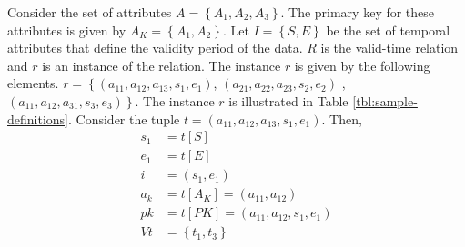 \begin{example}
Consider the set of attributes $A = \left \lbrace A_1, A_2, A_3 \right \rbrace$. The primary key for these attributes is given by $A_K = \left \lbrace A_1, A_2 \right \rbrace$. Let $I = \left \lbrace S, E \right \rbrace$ be the set of temporal attributes that define the validity period of the data. $R$ is the valid-time relation and $r$ is an instance of the relation. The instance $r$ is given by the following elements. $r = \left \lbrace \left(a_{11}, a_{12}, a_{13}, s_1 ,e_1 \right) \right.$,  $\left(a_{21}, a_{22}, a_{23}, s_2, e_2 \right)$ , $\left. \left(a_{11}, a_{12}, a_{31}, s_3, e_3 \right) \right \rbrace$. The instance $r$ is illustrated in Table \ref{tbl:sample-definitions}. 
Consider the tuple $t = \left(a_{11}, a_{12}, a_{13}, s_1 ,e_1 \right)$. Then,
\begin{align}
 \nonumber
s_1 &= t\left[S \right]\\
 \nonumber
e_1 &= t[E]\\
 \nonumber
i\ \ &= \left(s_1, e_1\right)\\
 \nonumber
a_k &= t\left[A_K\right] = \left(a_{11}, a_{12} \right) \\
 \nonumber
pk &= t\left[PK\right] =\left(a_{11}, a_{12}, s_1, e_1\right)\\
 \nonumber
Vt &= \left \lbrace t_1, t_3 \right \rbrace
\end{align}



\end{example}





